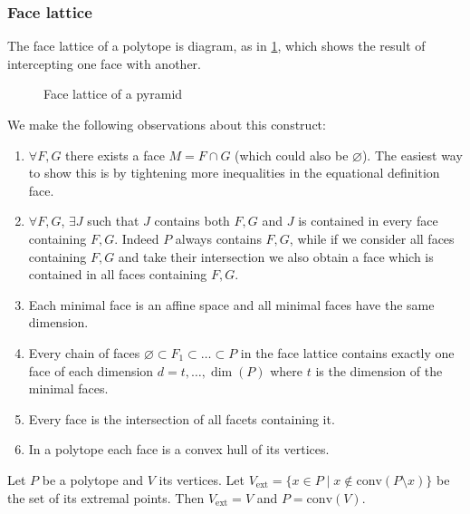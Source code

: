 \documentclass[12pt]{extarticle}
\begin{document}
\subsubsection{Face lattice}

The face lattice of a polytope is diagram, as in \cref{fig:face-lattice}, which shows the result of
intercepting one face with another.

\begin{figure}[!ht]
	\centering
	
	\caption{Face lattice of a pyramid}
	\label{fig:face-lattice}
\end{figure}

We make the following observations about this construct:
\begin{enumerate}[label=\roman*.]
	\item
	      $\forall F, G$ there exists a face $M = F \cap G$ (which could also
	      be $\varnothing$).
	      The easiest way to show this is by tightening more inequalities in the equational definition face.

	\item
	      $\forall F, G$, $\exists J$ such that $J$ contains both $F, G$ and $J$
	      is contained in every face containing $F, G$.
	      Indeed $P$ always contains $F, G$, while if we consider all faces containing $F, G$ and take their
	      intersection we also obtain a face which is contained in all faces containing $F, G$.

	\item
	      Each minimal face is an affine space and all minimal faces have the same dimension.

	\item
	      Every chain of faces $\varnothing \subset F_1 \subset \dots \subset P$
	      in the face lattice contains exactly one face of each dimension $d = t, \dots, \dim(P)$ where
	      $t$ is the dimension of the minimal faces.

	\item Every face is the intersection of all facets containing it.

	\item In a polytope each face is a convex hull of its vertices.
\end{enumerate}

\begin{theorem}{}{}
	Let $P$ be a polytope and $V$ its vertices.
	Let $V_\text{ext} = \{ x \in P \mid x \notin \mathrm{conv}(P\setminus{x})\}$ be the set of its
	extremal points.
	Then $V_\text{ext} = V$ and $P = \mathrm{conv}(V)$.
\end{theorem}
\end{document}
